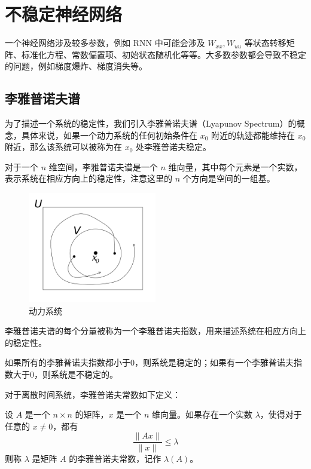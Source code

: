 \documentclass[12pt,a4paper]{amsart}
\begin{document}
\section{不稳定神经网络}

一个神经网络涉及较多参数，例如 RNN 中可能会涉及 $W_{xx}, W_{uu}$ 等状态转移矩阵、标准化方程、常数偏置项、初始状态随机化等等。大多数参数都会导致不稳定的问题，例如梯度爆炸、梯度消失等。

\subsection{李雅普诺夫谱}

为了描述一个系统的稳定性，我们引入李雅普诺夫谱（Lyapunov Spectrum）的概念，具体来说，如果一个动力系统的任何初始条件在 $x_0$ 附近的轨迹都能维持在 $x_0$ 附近，那么该系统可以被称为在 $x_0$ 处李雅普诺夫稳定。

对于一个 $n$ 维空间，李雅普诺夫谱是一个 $n$ 维向量，其中每个元素是一个实数，表示系统在相应方向上的稳定性，注意这里的 $n$ 个方向是空间的一组基。

\begin{figure}[htbp]
    \centering
    \includegraphics[width=0.5\textwidth]{./img/lyapunov_spectrum.jpeg}
    \caption{动力系统}
    \label{fig:lyapunov_spectrum}
\end{figure}

李雅普诺夫谱的每个分量被称为一个李雅普诺夫指数，用来描述系统在相应方向上的稳定性。

如果所有的李雅普诺夫指数都小于0，则系统是稳定的；如果有一个李雅普诺夫指数大于0，则系统是不稳定的。

对于离散时间系统，李雅普诺夫常数如下定义：

\begin{definition}
设 $A$ 是一个 $n\times n$ 的矩阵，$x$ 是一个 $n$ 维向量。如果存在一个实数 $\lambda$，使得对于任意的 $x\neq 0$，都有
\[
\frac{\|Ax\|}{\|x\|}\leq \lambda
\]
则称 $\lambda$ 是矩阵 $A$ 的李雅普诺夫常数，记作 $\lambda(A)$。
\end{definition}
\end{document}
